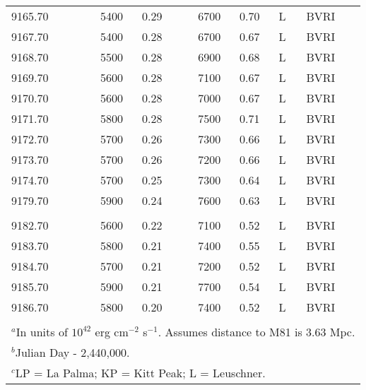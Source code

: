 \begin{center}
\begin{tabular} {l r c r c l l}
  \\
 9165.70  &  5400  &  0.29   &     6700  &  0.70 & L &  BVRI \\
 9167.70  &  5400  &  0.28   &     6700  &  0.67 & L &  BVRI \\
 9168.70  &  5500  &  0.28   &     6900  &  0.68 & L &  BVRI \\
 9169.70  &  5600  &  0.28   &     7100  &  0.67 & L &  BVRI \\
 9170.70  &  5600  &  0.28   &     7000  &  0.67 & L &  BVRI \\
 9171.70  &  5800  &  0.28   &     7500  &  0.71 & L &  BVRI \\
 9172.70  &  5700  &  0.26   &     7300  &  0.66 & L &  BVRI \\
 9173.70  &  5700  &  0.26   &     7200  &  0.66 & L &  BVRI \\
 9174.70  &  5700  &  0.25   &     7300  &  0.64 & L &  BVRI \\
 9179.70  &  5900  &  0.24   &     7600  &  0.63 & L &  BVRI \\
  \\
 9182.70  &  5600  &  0.22   &     7100  &  0.52 & L &  BVRI \\
 9183.70  &  5800  &  0.21   &     7400  &  0.55 & L &  BVRI \\
 9184.70  &  5700  &  0.21   &     7200  &  0.52 & L &  BVRI \\
 9185.70  &  5900  &  0.21   &     7700  &  0.54 & L &  BVRI \\
 9186.70  &  5800  &  0.20   &     7400  &  0.52 & L &  BVRI \\ \hline\hline
 \\
\multicolumn{7}{l}{$^a$In units of $10^{42}$ erg cm$^{-2}$ s$^{-1}$.  Assumes distance to M81 is 3.63 Mpc.} \\
\multicolumn{7}{l}{$^b$Julian Day - 2,440,000.} \\
\multicolumn{7}{l}{$^c$LP = La Palma; KP = Kitt Peak; L = Leuschner.} \\
\end{tabular}
\end{center}


\vfill
\eject


